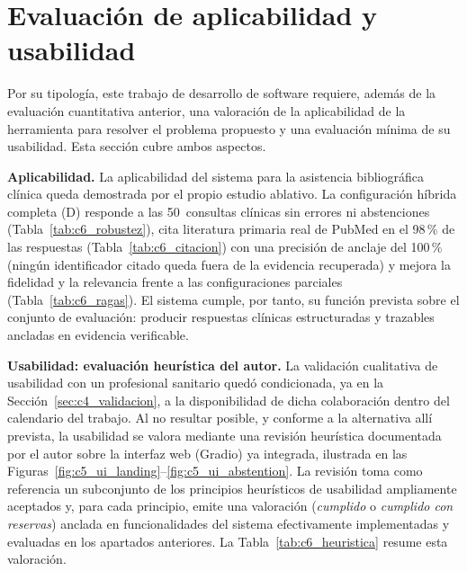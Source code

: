 \documentclass[11pt,a4paper,spanish]{book}
\numberwithin{equation}{chapter}
\numberwithin{figure}{chapter}
\begin{document}
\section{Evaluación de aplicabilidad y usabilidad}
\label{sec:c6_usabilidad}

Por su tipología, este trabajo de desarrollo de software requiere, además de la evaluación cuantitativa anterior, una valoración de la aplicabilidad de la herramienta para resolver el problema propuesto y una evaluación mínima de su usabilidad. Esta sección cubre ambos aspectos.

\textbf{Aplicabilidad.} La aplicabilidad del sistema para la asistencia bibliográfica clínica queda demostrada por el propio estudio ablativo. La configuración híbrida completa (D) responde a las 50~consultas clínicas sin errores ni abstenciones (Tabla~\ref{tab:c6_robustez}), cita literatura primaria real de PubMed en el 98\,\% de las respuestas (Tabla~\ref{tab:c6_citacion}) con una precisión de anclaje del 100\,\% (ningún identificador citado queda fuera de la evidencia recuperada) y mejora la fidelidad y la relevancia frente a las configuraciones parciales (Tabla~\ref{tab:c6_ragas}). El sistema cumple, por tanto, su función prevista sobre el conjunto de evaluación: producir respuestas clínicas estructuradas y trazables ancladas en evidencia verificable.

\textbf{Usabilidad: evaluación heurística del autor.} La validación cualitativa de usabilidad con un profesional sanitario quedó condicionada, ya en la Sección~\ref{sec:c4_validacion}, a la disponibilidad de dicha colaboración dentro del calendario del trabajo. Al no resultar posible, y conforme a la alternativa allí prevista, la usabilidad se valora mediante una revisión heurística documentada por el autor sobre la interfaz web (Gradio) ya integrada, ilustrada en las Figuras~\ref{fig:c5_ui_landing}--\ref{fig:c5_ui_abstention}. La revisión toma como referencia un subconjunto de los principios heurísticos de usabilidad ampliamente aceptados y, para cada principio, emite una valoración (\textit{cumplido} o \textit{cumplido con reservas}) anclada en funcionalidades del sistema efectivamente implementadas y evaluadas en los apartados anteriores. La Tabla~\ref{tab:c6_heuristica} resume esta valoración.
\end{document}
